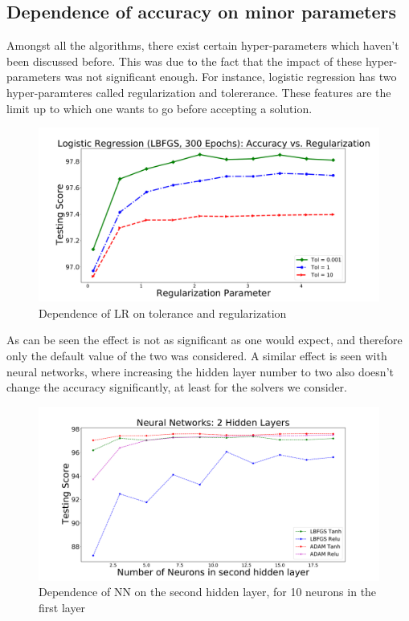 \subsection{Dependence of accuracy on minor parameters}
Amongst all the algorithms, there exist certain hyper-parameters which haven't been discussed before. This was due to the fact that the impact of these hyper-parameters was not significant enough. For instance, logistic regression has two hyper-paramteres called regularization and tolererance. These features are the limit up to which one wants to go before accepting a solution. 
\begin{figure}[h]
\includegraphics[width=\twopicsp\textwidth]{plots/lr_train_reg.pdf}
\caption{Dependence of LR on tolerance and regularization}
\label{fig:Lr_tol_reg}
\end{figure}
As can be seen the effect is not as significant as one would expect, and therefore only the default value of the two was considered. A similar effect is seen with neural networks, where increasing the hidden layer number to two also doesn't change the accuracy significantly, at least for the solvers we consider.
\begin{figure}[h]
\includegraphics[width=\twopicsp\textwidth]{plots/nn_2layers_3fgl.pdf}
\caption{Dependence of NN on the second hidden layer, for 10 neurons in the first layer}
\label{fig:Lr_tol_reg}
\end{figure}

